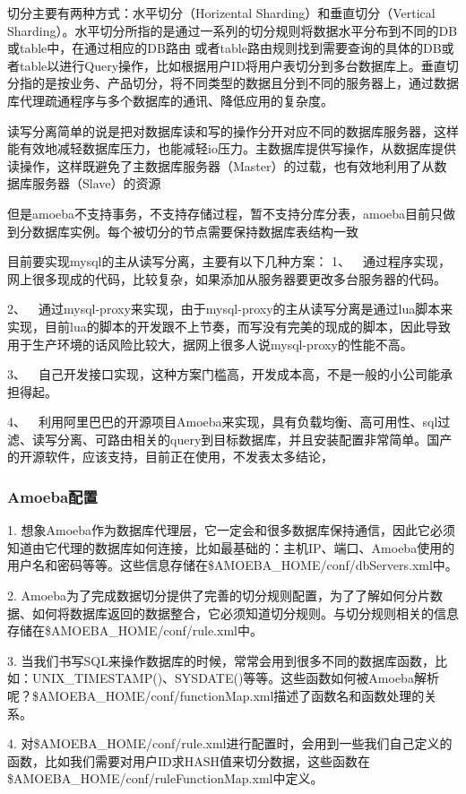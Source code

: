 切分主要有两种方式：水平切分（Horizental Sharding）和垂直切分（Vertical Sharding）。水平切分所指的是通过一系列的切分规则将数据水平分布到不同的DB或table中，在通过相应的DB路由 或者table路由规则找到需要查询的具体的DB或者table以进行Query操作，比如根据用户ID将用户表切分到多台数据库上。垂直切分指的是按业务、产品切分，将不同类型的数据且分到不同的服务器上，通过数据库代理疏通程序与多个数据库的通讯、降低应用的复杂度。

读写分离简单的说是把对数据库读和写的操作分开对应不同的数据库服务器，这样能有效地减轻数据库压力，也能减轻io压力。主数据库提供写操作，从数据库提供读操作，这样既避免了主数据库服务器（Master）的过载，也有效地利用了从数据库服务器（Slave）的资源 

但是amoeba不支持事务，不支持存储过程，暂不支持分库分表，amoeba目前只做到分数据库实例。每个被切分的节点需要保持数据库表结构一致

目前要实现mysql的主从读写分离，主要有以下几种方案：
1、  通过程序实现，网上很多现成的代码，比较复杂，如果添加从服务器要更改多台服务器的代码。

2、  通过mysql-proxy来实现，由于mysql-proxy的主从读写分离是通过lua脚本来实现，目前lua的脚本的开发跟不上节奏，而写没有完美的现成的脚本，因此导致用于生产环境的话风险比较大，据网上很多人说mysql-proxy的性能不高。

3、  自己开发接口实现，这种方案门槛高，开发成本高，不是一般的小公司能承担得起。

4、  利用阿里巴巴的开源项目Amoeba来实现，具有负载均衡、高可用性、sql过滤、读写分离、可路由相关的query到目标数据库，并且安装配置非常简单。国产的开源软件，应该支持，目前正在使用，不发表太多结论，

\subsubsection{Amoeba配置}
1.	想象Amoeba作为数据库代理层，它一定会和很多数据库保持通信，因此它必须知道由它代理的数据库如何连接，比如最基础的：主机IP、端口、Amoeba使用的用户名和密码等等。这些信息存储在\$AMOEBA_HOME/conf/dbServers.xml中。

2.	Amoeba为了完成数据切分提供了完善的切分规则配置，为了了解如何分片数据、如何将数据库返回的数据整合，它必须知道切分规则。与切分规则相关的信息存储在\$AMOEBA_HOME/conf/rule.xml中。

3.	当我们书写SQL来操作数据库的时候，常常会用到很多不同的数据库函数，比如：UNIX_TIMESTAMP()、SYSDATE()等等。这些函数如何被Amoeba解析呢？\$AMOEBA_HOME/conf/functionMap.xml描述了函数名和函数处理的关系。

4.	对\$AMOEBA_HOME/conf/rule.xml进行配置时，会用到一些我们自己定义的函数，比如我们需要对用户ID求HASH值来切分数据，这些函数在\$AMOEBA_HOME/conf/ruleFunctionMap.xml中定义。

